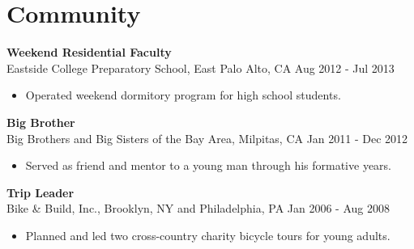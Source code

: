 \section{Community}
\textbf{Weekend Residential Faculty} \\
Eastside College Preparatory School, East Palo Alto, CA \hfill Aug 2012 - Jul 2013
\begin{itemize}  \itemsep -2pt %
\item Operated weekend dormitory program for high school students.
\end{itemize}

\textbf{Big Brother} \\
Big Brothers and Big Sisters of the Bay Area, Milpitas, CA \hfill Jan 2011 - Dec 2012
\begin{itemize}  \itemsep -2pt %
\item Served as friend and mentor to a young man through his formative years.
\end{itemize}

\textbf{Trip Leader} \\
Bike \& Build, Inc., Brooklyn, NY and Philadelphia, PA \hfill Jan 2006 - Aug 2008
\begin{itemize}  \itemsep -2pt %
\item Planned and led two cross-country charity bicycle tours for young adults.
\end{itemize}

